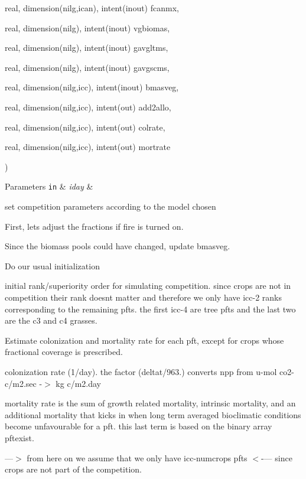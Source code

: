 {\begin{DoxyParamCaption}
\item[{real, dimension(nilg,ican), intent(inout)}]{fcanmx, }
\item[{real, dimension(nilg), intent(inout)}]{vgbiomas, }
\item[{real, dimension(nilg), intent(inout)}]{gavgltms, }
\item[{real, dimension(nilg), intent(inout)}]{gavgscms, }
\item[{real, dimension(nilg,icc), intent(inout)}]{bmasveg, }
\item[{real, dimension(nilg,icc), intent(out)}]{add2allo, }
\item[{real, dimension(nilg,icc), intent(out)}]{colrate, }
\item[{real, dimension(nilg,icc), intent(out)}]{mortrate}
\end{DoxyParamCaption}
)}\label{group__competition__scheme__competition_ga008cbfcefd33aaccb8f2b81cf8326451}

\begin{DoxyParams}[1]{Parameters}
\mbox{\tt in}  & {\em iday} & \\
\hline
\end{DoxyParams}
set competition parameters according to the model chosen

First, let\textquotesingle{}s adjust the fractions if fire is turned on.

Since the biomass pools could have changed, update bmasveg.

Do our usual initialization

initial rank/superiority order for simulating competition. since crops are not in competition their rank doesn\textquotesingle{}t matter and therefore we only have icc-\/2 ranks corresponding to the remaining pfts. the first icc-\/4 are tree pfts and the last two are the c3 and c4 grasses.

Estimate colonization and mortality rate for each pft, except for crops whose fractional coverage is prescribed.

colonization rate (1/day). the factor (deltat/963.) converts npp from u-\/mol co2-\/c/m2.\+sec -\/$>$ kg c/m2.\+day

mortality rate is the sum of growth related mortality, intrinsic mortality, and an additional mortality that kicks in when long term averaged bioclimatic conditions become unfavourable for a pft. this last term is based on the binary array pftexist.

---$>$ from here on we assume that we only have icc-\/numcrops pfts $<$-\/--- since crops are not part of the competition.

